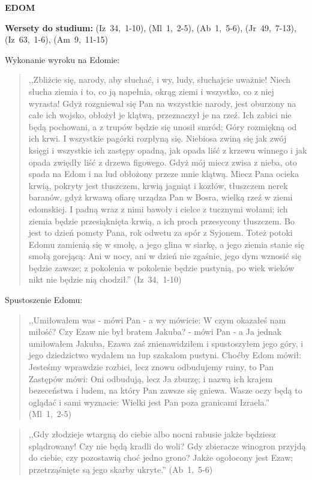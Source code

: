 \documentclass[10pt,a4paper,oneside]{article}
\begin{document}
\centerline{\textbf{\MakeUppercase{Edom}}}
\begin{center}
\textbf{Wersety do studium:} (Iz~34,~1-10), (Ml~1,~2-5), (Ab~1,~5-6), (Jr~49,~7-13), (Iz~63,~1-6), (Am~9,~11-15)
\end{center}
Wykonanie wyroku na Edomie:
\begin{quote}
,,Zbliżcie się, narody, aby słuchać, i wy, ludy, słuchajcie uważnie! Niech słucha ziemia i to, co ją napełnia, okrąg ziemi i wszystko, co z niej wyrasta! Gdyż rozgniewał się Pan na wszystkie narody, jest oburzony na całe ich wojsko, obłożył je klątwą, przeznaczył je na rzeź. Ich zabici nie będą pochowani, a z trupów będzie się unosił smród; Góry rozmiękną od ich krwi. I wszystkie pagórki rozpłyną się. Niebiosa zwiną się jak zwój księgi i wszystkie ich zastępy opadną, jak opada liść z krzewu winnego i jak opada zwiędły liść z drzewa figowego. Gdyż mój miecz zwisa z nieba, oto spada na Edom i na lud obłożony przeze mnie klątwą. Miecz Pana ocieka krwią, pokryty jest tłuszczem, krwią jagniąt i kozłów, tłuszczem nerek baranów, gdyż krwawą ofiarę urządza Pan w Bosra, wielką rzeź w ziemi edomskiej. I padną wraz z nimi bawoły i cielce z tucznymi wołami; ich ziemia będzie przesiąknięta krwią, a ich proch przesycony tłuszczem. Bo jest to dzień pomsty Pana, rok odwetu za spór z Syjonem. Toteż potoki Edomu zamienią się w smołę, a jego glina w siarkę, a jego ziemia stanie się smołą gorejącą: Ani w nocy, ani w dzień nie zgaśnie, jego dym wznosić się będzie zawsze; z pokolenia w pokolenie będzie pustynią, po wiek wieków nikt nie będzie nią chodził.'' (Iz~34,~1-10)
\end{quote}
Spustoszenie Edomu:
\begin{quote}
,,Umiłowałem was - mówi Pan - a wy mówicie: W czym okazałeś nam miłość? Czy Ezaw nie był bratem Jakuba? - mówi Pan - a Ja jednak umiłowałem Jakuba, Ezawa zaś znienawidziłem i spustoszyłem jego góry, i jego dziedzictwo wydałem na łup szakalom pustyni. Choćby Edom mówił: Jesteśmy wprawdzie rozbici, lecz znowu odbudujemy ruiny, to Pan Zastępów mówi: Oni odbudują, lecz Ja zburzę; i nazwą ich krajem bezeceństwa i ludem, na który Pan zawsze się gniewa. Wasze oczy będą to oglądać i sami wyznacie: Wielki jest Pan poza granicami Izraela.'' (Ml~1,~2-5)
\end{quote}
\begin{quote}
,,Gdy złodzieje wtargną do ciebie albo nocni rabusie jakże będziesz splądrowany! Czy nie będą kradli do woli? Gdy zbieracze winogron przyjdą do ciebie, czy pozostawią choć jedno grono? Jakże ogołocony jest Ezaw; przetrząśnięte są jego skarby ukryte.'' (Ab~1,~5-6)
\end{quote}
\end{document}
